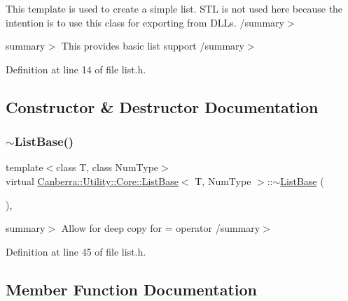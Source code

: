 This template is used to create a simple list. S\+TL is not used here because the intention is to use this class for exporting from D\+LL\textquotesingle{}s. /summary$>$ 

summary$>$ This provides basic list support /summary$>$ 

Definition at line 14 of file list.\+h.



\subsection{Constructor \& Destructor Documentation}
\mbox{\label{class_canberra_1_1_utility_1_1_core_1_1_list_base_a280204e71e12060a321cc5e12753e65d_a280204e71e12060a321cc5e12753e65d}} 
\subsubsection{\texorpdfstring{$\sim$\+List\+Base()}{~ListBase()}}
{\footnotesize\ttfamily template$<$class T, class Num\+Type$>$ \\
virtual \hyperlink{class_canberra_1_1_utility_1_1_core_1_1_list_base}{Canberra\+::\+Utility\+::\+Core\+::\+List\+Base}$<$ T, Num\+Type $>$\+::$\sim$\hyperlink{class_canberra_1_1_utility_1_1_core_1_1_list_base}{List\+Base} (\begin{DoxyParamCaption}{ }\end{DoxyParamCaption})\hspace{0.3cm}{\ttfamily [inline]}, {\ttfamily [virtual]}}

summary$>$ Allow for deep copy for = operator /summary$>$ 

Definition at line 45 of file list.\+h.



\subsection{Member Function Documentation}
\mbox{\label{class_canberra_1_1_utility_1_1_core_1_1_list_base_aaacf0eb537ee5765a6929dc4dd42c04b_aaacf0eb537ee5765a6929dc4dd42c04b}} 
